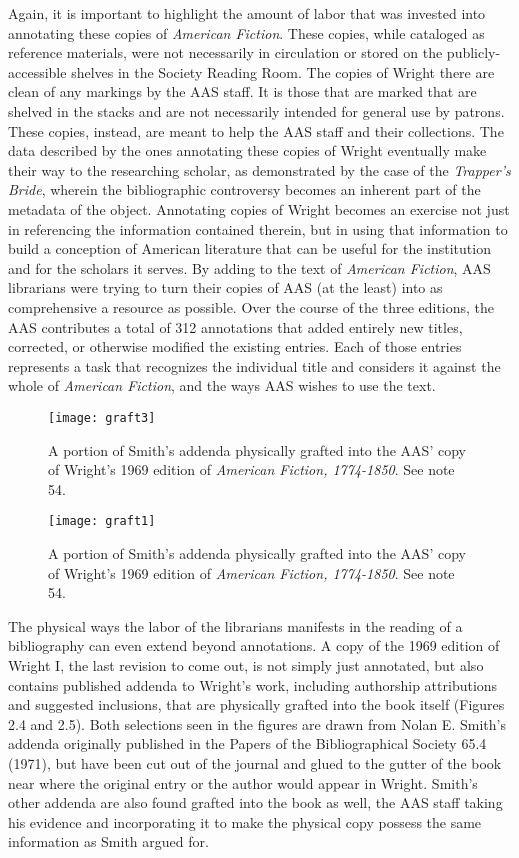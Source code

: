 Again, it is important to highlight the amount of labor that was invested into annotating these copies of \textit{American Fiction}. These copies, while cataloged as reference materials, were not necessarily in circulation or stored on the publicly-accessible shelves in the Society Reading Room. The copies of Wright there are clean of any markings by the AAS staff. It is those that are marked that are shelved in the stacks and are not necessarily intended for general use by patrons. These copies, instead, are meant to help the AAS staff and their collections. The data described by the ones annotating these copies of Wright eventually make their way to the researching scholar, as demonstrated by the case of the \textit{Trapper's Bride}, wherein the bibliographic controversy becomes an inherent part of the metadata of the object. Annotating copies of Wright becomes an exercise not just in referencing the information contained therein, but in using that information to build a conception of American literature that can be useful for the institution and for the scholars it serves. By adding to the text of \textit{American Fiction}, AAS librarians were trying to turn their copies of AAS (at the least) into as comprehensive a resource as possible. Over the course of the three editions, the AAS contributes a total of 312 annotations that added entirely new titles, corrected, or otherwise modified the existing entries. Each of those entries represents a task that recognizes the individual title and considers it against the whole of \textit{American Fiction}, and the ways AAS wishes to use the text. 

\begin{figure}[h]
\texttt{[image: graft3]}
\caption{A portion of Smith's addenda physically grafted into the AAS' copy of Wright's 1969 edition of \textit{American Fiction, 1774-1850}. See note 54.}
\end{figure}

\begin{figure}
\texttt{[image: graft1]}
\caption{A portion of Smith's addenda physically grafted into the AAS' copy of Wright's 1969 edition of \textit{American Fiction, 1774-1850}. See note 54.}
\end{figure}

The physical ways the labor of the librarians manifests in the reading of a bibliography can even extend beyond annotations. A copy of the 1969 edition of Wright I, the last revision to come out, is not simply just annotated, but also contains published addenda to Wright's work, including authorship attributions and suggested inclusions, that are physically grafted into the book itself (Figures 2.4 and 2.5). Both selections seen in the figures are drawn from Nolan E. Smith's addenda originally published in the Papers of the Bibliographical Society 65.4 (1971), but have been cut out of the journal and glued to the gutter of the book near where the original entry or the author would appear in Wright. Smith's other addenda are also found grafted into the book as well, the AAS staff taking his evidence and incorporating it to make the physical copy possess the same information as Smith argued for. 

